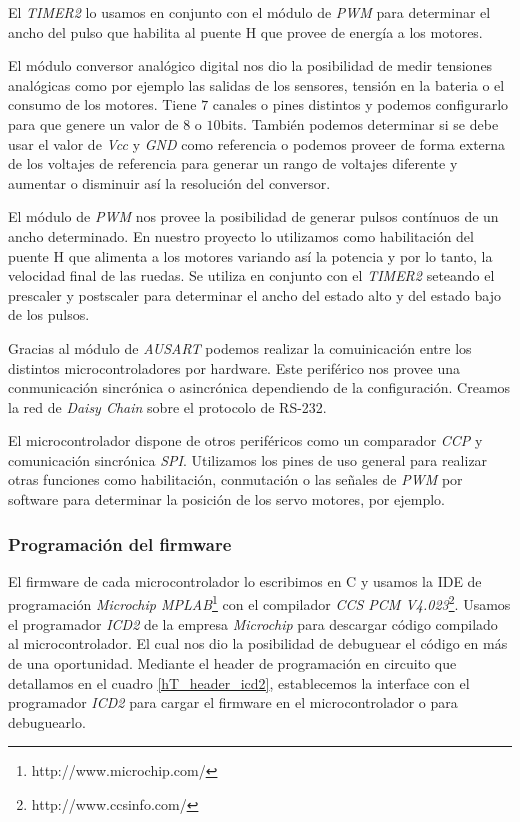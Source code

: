 El \emph{TIMER2} lo usamos en conjunto con el m\'odulo de \emph{PWM} para determinar el ancho del pulso que habilita al puente H
que provee de energ\'ia a los motores.

El m\'odulo conversor anal\'ogico digital nos dio la posibilidad de medir tensiones anal\'ogicas como por ejemplo
las salidas de los sensores, tensi\'on en la bateria o el consumo de los motores.
Tiene $7$ canales o pines distintos y podemos configurarlo para que genere un valor de $8$ o $10$bits.
Tambi\'en podemos determinar si se debe usar el valor de \emph{Vcc} y \emph{GND} como referencia o podemos proveer
de forma externa de los voltajes de referencia para generar un rango de voltajes diferente y aumentar o disminuir
as\'i la resoluci\'on del conversor.

El m\'odulo de \emph{PWM} nos provee la posibilidad de generar pulsos cont\'inuos de un ancho determinado.
En nuestro proyecto lo utilizamos como habilitaci\'on del puente H que alimenta a los motores variando as\'i la
potencia y por lo tanto, la velocidad final de las ruedas.
Se utiliza en conjunto con el \emph{TIMER2} seteando el prescaler y postscaler para determinar el ancho del
estado alto y del estado bajo de los pulsos.

Gracias al m\'odulo de \emph{AUSART} podemos realizar la comuinicaci\'on entre los distintos microcontroladores por hardware.
Este perif\'erico nos provee una conmunicaci\'on sincr\'onica o asincr\'onica dependiendo de la configuraci\'on.
Creamos la red de \emph{Daisy Chain} sobre el protocolo de RS-232.

El microcontrolador dispone de otros perif\'ericos como un comparador \emph{CCP} y comunicaci\'on sincr\'onica \emph{SPI}.
Utilizamos los pines de uso general para realizar otras funciones como habilitaci\'on, conmutaci\'on o las se\~nales de
\emph{PWM} por software para determinar la posici\'on de los servo motores, por ejemplo.

\subsubsection{Programaci\'on del firmware}
\label{h_controlador_micro_programacion}

El firmware de cada microcontrolador lo escribimos en C y usamos la IDE de programaci\'on 
\emph{Microchip MPLAB}\footnote{http://www.microchip.com/} con el compilador \emph{CCS PCM V4.023}\footnote{http://www.ccsinfo.com/}.
Usamos el programador \emph{ICD2} de la empresa \emph{Microchip} para descargar c\'odigo compilado al microcontrolador.
El cual nos dio la posibilidad de debuguear el c\'odigo en m\'as de una oportunidad.
Mediante el header de programaci\'on en circuito que detallamos en el cuadro \ref{hT_header_icd2}, establecemos la
interface con el programador \emph{ICD2} para cargar el firmware en el microcontrolador o para debuguearlo.

